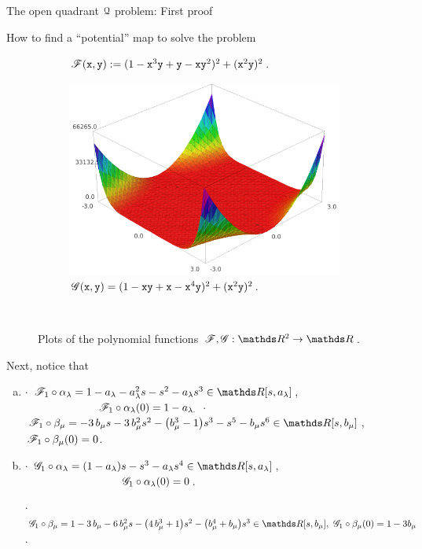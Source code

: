 \documentclass[11pt, a4paper, english, twoside, notitlepage, openright]{report}
\begin{document}
\begin{chapter}{The open quadrant $\mathcal{Q}$ problem: First proof}
\begin{section}{How to find a ``potential'' map to solve the problem}
\begin{figure}[h]
\begin{subfigure}{.49\linewidth}
\caption{$\mathscr{F}({\tt x},{\tt y}):=(1-{\tt x}^3{\tt y}+{\tt y}-{\tt x}{\tt y}^2)^2+({\tt x}^2{\tt y})^2$.\label{fig:F}}
\end{subfigure}
\begin{subfigure}{.50\linewidth}\centering
\includegraphics[width=1\textwidth]{plots/ch1_05_G.png}
\caption{$\mathscr{G}({\tt x},{\tt y})=(1-{\tt x}{\tt y}+{\tt x}-{\tt x}^4{\tt y})^2+({\tt x}^2{\tt y})^2$.\label{fig:G}}
\end{subfigure}\\[1ex]
\caption{Plots of the polynomial functions $\F,\G:\R^2\to\R$.\label{fig:plotFG}}
\end{figure}
Next, notice that
\begin{enumerate}[(a)]
\item $\cdot$ $\F_1\circ\alpha_\lambda=1-a_{\lambda}-a_{\lambda}^{2} s-s^{2}-a_{\lambda} s^{3}\in\R[s,a_{\lambda}]$,
$\qquad\qquad\qquad \,\, \, \,   \mathscr{F}_1\circ\alpha_{\lambda }(0)=1-a_{\lambda. }$ \newline
$\cdot$ $\F_1\circ\beta_{\mu}=-3\,b_{\mu}s-3 \,b_{\mu}^{2} s^{2}-{\left(b_{\mu}^{3}-1\right)}s^{3}-s^{5}-b_{\mu}s^{6}\in\R[s,b_{\mu}]$,
$\, \mathscr{F}_1\circ\beta_{\mu}(0)=0$.
				
\item $\cdot$ $ \G_1\circ\alpha_{\lambda } = {\left(1-a_{\lambda} \right)}s-s^{3}-a_{\lambda} s^{4} \in\R[s,a_{\lambda}]$,
$\qquad\qquad\qquad\qquad\, \, \, \, \,\mathscr{G}_1\circ\alpha_{\lambda }(0)=0$.

$\cdot$ $\G_1\circ\beta_{\mu}=1-3\, b_{\mu}-6\,b_{\mu}^{2}s-{\left(4\,b_{\mu}^{3}+1\right)}s^{2}-{\left(b_{\mu}^{4}+ b_{\mu}\right)}s^{3}\in\R[s,b_{\mu}], \, \, \G_1\circ\beta_{\mu}(0)=1-3b_{\mu}$.
		

\end{enumerate}
\end{section}
\end{chapter}
\end{document}
